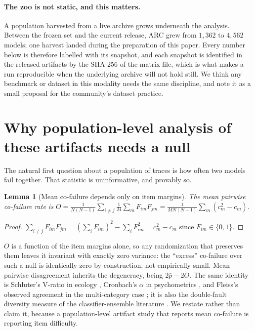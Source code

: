 \documentclass{article}
\newtheorem{lemma}{Lemma}
\begin{document}
\paragraph{The zoo is not static, and this matters.} A population harvested from a live archive
grows underneath the analysis. Between the frozen set and the current release, ARC grew from
$1{,}362$ to $4{,}562$ models; one harvest landed during the preparation of this paper. Every
number below is therefore labelled with its snapshot, and each snapshot is identified in the
released artifacts by the SHA-256 of the matrix file, which is what makes a run reproducible when
the underlying archive will not hold still. We think any benchmark or dataset in this modality
needs the same discipline, and note it as a small proposal for the community's dataset practice.

\section{Why population-level analysis of these artifacts needs a null}
\label{sec:null}

The natural first question about a population of traces is how often two models fail together. That
statistic is uninformative, and provably so.

\begin{lemma}[Mean co-failure depends only on item margins]
\label{lem:mean}
The mean pairwise co-failure rate is
$O=\frac{1}{N(N-1)}\sum_{i\neq j}\frac1M\sum_m F_{im}F_{jm}=\frac{1}{MN(N-1)}\sum_m (c_m^2-c_m)$.
\end{lemma}
\begin{proof}
$\sum_{i\neq j}F_{im}F_{jm}=(\sum_i F_{im})^2-\sum_i F_{im}^2=c_m^2-c_m$ since $F_{im}\in\{0,1\}$.
\end{proof}

\noindent $O$ is a function of the item margins alone, so any randomization that preserves them
leaves it invariant with exactly zero variance: the ``excess'' co-failure over such a null is
identically zero by construction, not empirically small. Mean pairwise disagreement inherits the
degeneracy, being $2\bar p - 2O$. The same identity is Schluter's V-ratio in ecology
\citep{schluter1984,gotelli2000}, Cronbach's $\alpha$ in psychometrics \citep{cronbach1951}, and
Fleiss's observed agreement in the multi-category case \citep{fleiss1971}; it is also the
double-fault diversity measure of the classifier-ensemble literature \citep{kuncheva2003}. We
restate rather than claim it, because a population-level artifact study that reports mean
co-failure is reporting item difficulty.
\end{document}
